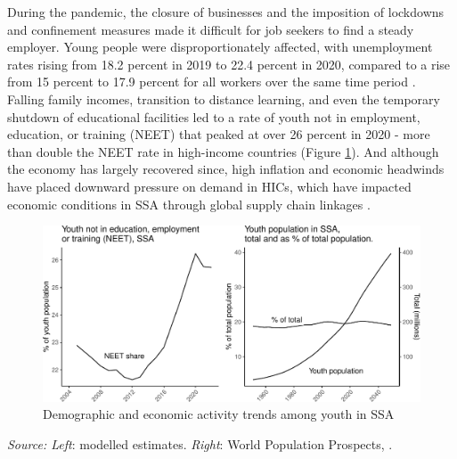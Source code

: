 \documentclass[
  a4paper, twoside, 12pt]{book}
\begin{document}
During the pandemic, the closure of businesses and the imposition of lockdowns and confinement measures made it difficult for job seekers to find a steady employer. Young people were disproportionately affected, with unemployment rates rising from 18.2 percent in 2019 to 22.4 percent in 2020, compared to a rise from 15 percent to 17.9 percent for all workers over the same time period \autocite{ilo2022a,africandevelopmentbank2023}. Falling family incomes, transition to distance learning, and even the temporary shutdown of educational facilities led to a rate of youth not in employment, education, or training (NEET) that peaked at over 26 percent in 2020 - more than double the NEET rate in high-income countries (Figure \ref{fig:fig-neet}). And although the economy has largely recovered since, high inflation and economic headwinds have placed downward pressure on demand in HICs, which have impacted economic conditions in SSA through global supply chain linkages \autocite{ilo2023}.

\begin{figure}[H]

{\centering \includegraphics{figures/fig-neet-1} 

}

\caption{Demographic and economic activity trends among youth in SSA}\label{fig:fig-neet}
\end{figure}

\footnotesize

\noindent \emph{Source: Left}: \textcite{ilo2023b} modelled estimates. \emph{Right}: World Population Prospects, \textcite{unitednations2022}.
\normalsize
\hfill\break
\end{document}
